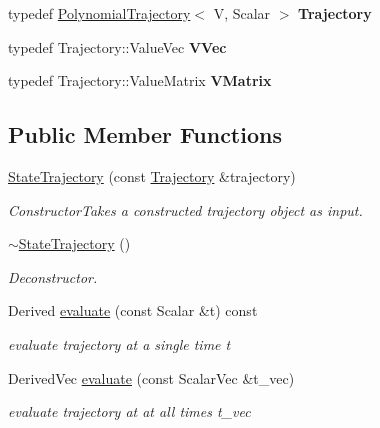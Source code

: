 \begin{DoxyCompactItemize}
\item 
typedef \hyperlink{classow__core_1_1PolynomialTrajectory}{Polynomial\+Trajectory}$<$ V, Scalar $>$ {\bfseries Trajectory}\hypertarget{classow__core_1_1StateTrajectory_ae47c89b4e24f15ff40f715e6c8b411e1}{}\label{classow__core_1_1StateTrajectory_ae47c89b4e24f15ff40f715e6c8b411e1}

\item 
typedef Trajectory\+::\+Value\+Vec {\bfseries V\+Vec}\hypertarget{classow__core_1_1StateTrajectory_a90e12f1327db3d28ae50954ab87ef51b}{}\label{classow__core_1_1StateTrajectory_a90e12f1327db3d28ae50954ab87ef51b}

\item 
typedef Trajectory\+::\+Value\+Matrix {\bfseries V\+Matrix}\hypertarget{classow__core_1_1StateTrajectory_a10c19dcd2f9802e838b1dfbd672ed0c2}{}\label{classow__core_1_1StateTrajectory_a10c19dcd2f9802e838b1dfbd672ed0c2}

\end{DoxyCompactItemize}
\subsection*{Public Member Functions}
\begin{DoxyCompactItemize}
\item 
\hyperlink{classow__core_1_1StateTrajectory_a9047cbf304d69152b0915d16511e8145}{State\+Trajectory} (const \hyperlink{classow__core_1_1PolynomialTrajectory}{Trajectory} \&trajectory)\hypertarget{classow__core_1_1StateTrajectory_a9047cbf304d69152b0915d16511e8145}{}\label{classow__core_1_1StateTrajectory_a9047cbf304d69152b0915d16511e8145}

\begin{DoxyCompactList}\small\item\em ConstructorTakes a constructed trajectory object as input. \end{DoxyCompactList}\item 
\hyperlink{classow__core_1_1StateTrajectory_a99dd20d6d179604a9a476d1b4d1b0fd4}{$\sim$\+State\+Trajectory} ()\hypertarget{classow__core_1_1StateTrajectory_a99dd20d6d179604a9a476d1b4d1b0fd4}{}\label{classow__core_1_1StateTrajectory_a99dd20d6d179604a9a476d1b4d1b0fd4}

\begin{DoxyCompactList}\small\item\em Deconstructor. \end{DoxyCompactList}\item 
Derived \hyperlink{classow__core_1_1StateTrajectory_a484c684df0f4253fb3c591bd7dfa679f}{evaluate} (const Scalar \&t) const 
\begin{DoxyCompactList}\small\item\em evaluate trajectory at a single time t \end{DoxyCompactList}\item 
Derived\+Vec \hyperlink{classow__core_1_1StateTrajectory_a4de43196a868ed430ae597fdd91b78a6}{evaluate} (const Scalar\+Vec \&t\+\_\+vec)
\begin{DoxyCompactList}\small\item\em evaluate trajectory at at all times t\+\_\+vec \end{DoxyCompactList}\end{DoxyCompactItemize}
